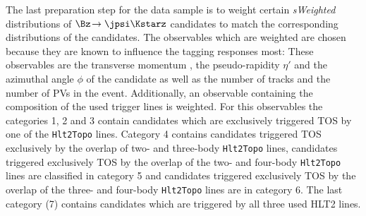The last preparation step for the data sample is to weight certain \emph{sWeighted} distributions of $\Bz\!\to\jpsi\Kstarz$ candidates to match the corresponding distributions of the \BdToDpi candidates.
The observables which are weighted are chosen because they are known to influence the tagging responses most:
These observables are the transverse momentum \pt, the pseudo-rapidity $\eta'$ and the azimuthal angle $\phi$ of the \Bz candidate as well as the number of tracks and the number of \ac{PV}s in the event.
Additionally, an observable containing the composition of the used trigger lines is weighted.
For this observables the categories \num{1}, \num{2} and \num{3} contain candidates which are exclusively triggered TOS by one of the \verb!Hlt2Topo! lines.
Category \num{4} contains candidates triggered TOS exclusively by the overlap of two- and three-body \verb!Hlt2Topo! lines, candidates triggered exclusively TOS by the overlap of the two- and four-body \verb!Hlt2Topo! lines are classified in category \num{5} and candidates triggered exclusively TOS by the overlap of the three- and four-body \verb!Hlt2Topo! lines are in category \num{6}.
The last category (\num{7}) contains candidates which are triggered by all three used HLT2 lines.

